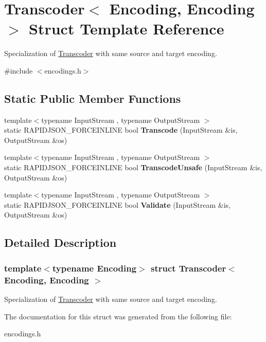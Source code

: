 \hypertarget{a02184}{}\section{Transcoder$<$ Encoding, Encoding $>$ Struct Template Reference}
\label{a02184}


Specialization of \hyperlink{a02180}{Transcoder} with same source and target encoding.  




{\ttfamily \#include $<$encodings.\+h$>$}

\subsection*{Static Public Member Functions}
\begin{DoxyCompactItemize}
\item 
\mbox{\label{a02184_aad11cdc2b829123a7b9969e34d456813}} 
{\footnotesize template$<$typename Input\+Stream , typename Output\+Stream $>$ }\\static R\+A\+P\+I\+D\+J\+S\+O\+N\+\_\+\+F\+O\+R\+C\+E\+I\+N\+L\+I\+NE bool {\bfseries Transcode} (Input\+Stream \&is, Output\+Stream \&os)
\item 
\mbox{\label{a02184_addf67decfff7d0de510c47842eb53cef}} 
{\footnotesize template$<$typename Input\+Stream , typename Output\+Stream $>$ }\\static R\+A\+P\+I\+D\+J\+S\+O\+N\+\_\+\+F\+O\+R\+C\+E\+I\+N\+L\+I\+NE bool {\bfseries Transcode\+Unsafe} (Input\+Stream \&is, Output\+Stream \&os)
\item 
\mbox{\label{a02184_a536aa3930251161d05e112947ec2f9c8}} 
{\footnotesize template$<$typename Input\+Stream , typename Output\+Stream $>$ }\\static R\+A\+P\+I\+D\+J\+S\+O\+N\+\_\+\+F\+O\+R\+C\+E\+I\+N\+L\+I\+NE bool {\bfseries Validate} (Input\+Stream \&is, Output\+Stream \&os)
\end{DoxyCompactItemize}


\subsection{Detailed Description}
\subsubsection*{template$<$typename Encoding$>$\newline
struct Transcoder$<$ Encoding, Encoding $>$}

Specialization of \hyperlink{a02180}{Transcoder} with same source and target encoding. 

The documentation for this struct was generated from the following file\+:\begin{DoxyCompactItemize}
\item 
encodings.\+h\end{DoxyCompactItemize}
